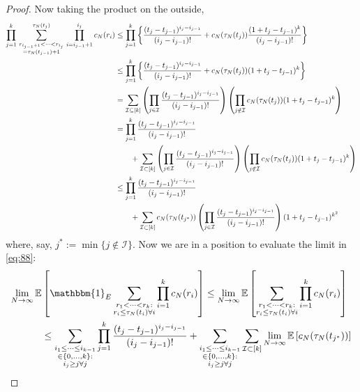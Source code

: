 \documentclass{article}
\newcommand{\E}{\mathbb{E}}
\newcommand{\1}[1]{\mathbbm{1}_{#1}}
\begin{document}
\begin{proof}
Now taking the product on the outside,
\begin{align}
\prod_{j=1}^k \,
\sum_{\substack{ r_{i_{j-1}+1} < \dots < r_{i_j} \\ = \tau_N(t_{j-1})+1}}^{\tau_N(t_j)}  \,\prod_{i=i_{j-1}+1}^{i_j} c_N(r_i)
&\leq \prod_{j=1}^k \left\{ \frac{(t_j - t_{j-1})^{i_j - i_{j-1}}}{(i_j - i_{j-1})!}  
+ c_N(\tau_N(t_j)) \frac{(1+ t_j - t_{j-1})^k}{(i_j - i_{j-1})!} \right\} \notag\\
&\leq \prod_{j=1}^k \left\{ \frac{(t_j - t_{j-1})^{i_j - i_{j-1}}}{(i_j - i_{j-1})!}  
+ c_N(\tau_N(t_j)) (1+ t_j - t_{j-1})^k \right\} \notag\\
&= \sum_{\mathcal{I} \subseteq [k]} \left( \prod_{j\in\mathcal{I}} \frac{(t_j - t_{j-1})^{i_j - i_{j-1}}}{(i_j - i_{j-1})!} \right)
\left( \prod_{j\notin\mathcal{I}} c_N(\tau_N(t_j)) (1+ t_j - t_{j-1})^k \right) \notag\\
&= \prod_{j=1}^k \frac{(t_j - t_{j-1})^{i_j - i_{j-1}}}{(i_j - i_{j-1})!}  \notag\\
&\qquad+ \sum_{\mathcal{I} \subset [k]} \left( \prod_{j\in\mathcal{I}} \frac{(t_j - t_{j-1})^{i_j - i_{j-1}}}{(i_j - i_{j-1})!}\right)
\left( \prod_{j\notin\mathcal{I}} c_N(\tau_N(t_j)) (1+ t_j - t_{j-1})^k \right) \notag\\
&\leq \prod_{j=1}^k \frac{(t_j - t_{j-1})^{i_j - i_{j-1}}}{(i_j - i_{j-1})!}  \notag\\
&\qquad+ \sum_{\mathcal{I} \subset [k]} c_N(\tau_N(t_{j^*})) \left( \prod_{j\in\mathcal{I}} \frac{(t_j - t_{j-1})^{i_j - i_{j-1}}}{(i_j - i_{j-1})!}\right)
(1+ t_j - t_{j-1})^{k^2} \label{eq:91}
\end{align}
where, say, $j^* := \min\{ j\notin\mathcal{I}\}$.
Now we are in a position to evaluate the limit in \eqref{eq:88}:
\begin{align}
\lim_{N\to\infty} \E &\left[ \1{E} \sum_{\substack{r_1<\dots<r_k :\\ r_i\leq \tau_N(t_i) \forall i}} \prod_{i=1}^k c_N(r_i) \right] 
\leq \lim_{N\to\infty} \E \left[\sum_{\substack{r_1<\dots<r_k :\\ r_i\leq \tau_N(t_i) \forall i}} \prod_{i=1}^k c_N(r_i) \right] \notag\\
&\leq \sum_{\substack{i_1\leq \dots\leq i_{k-1}\\ \in \{0,\dots,k\} :\\ i_j \geq j \forall j}} \prod_{j=1}^k \frac{(t_j - t_{j-1})^{i_j - i_{j-1}}}{(i_j - i_{j-1})!} 
+ \sum_{\substack{i_1\leq \dots\leq i_{k-1}\\ \in \{0,\dots,k\} :\\ i_j \geq j \forall j}} \sum_{\mathcal{I} \subset [k]} \lim_{N\to\infty} \E \left[ c_N(\tau_N(t_{j^*})) \right] 

\end{align}
\end{proof}
\end{document}
